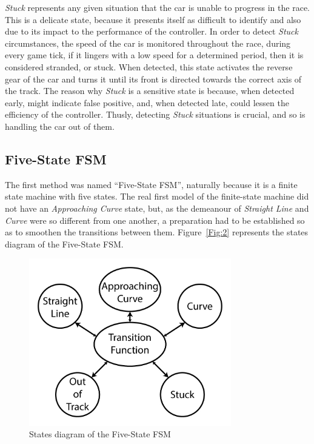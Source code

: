 	\emph{Stuck} represents any given situation that the car is unable to progress in the race. This is a delicate state, because it presents itself as difficult to identify and also due to its impact to the performance of the controller. In order to detect \emph{Stuck} circumstances, the speed of the car is monitored throughout the race, during every game tick, if it lingers with a low speed for a determined period, then it is considered stranded, or stuck. When detected, this state activates the reverse gear of the car and turns it until its front is directed towards the correct axis of the track. The reason why \emph{Stuck} is a sensitive state is because, when detected early, might indicate false positive, and, when detected late, could lessen the efficiency of the controller. Thusly, detecting \textit{Stuck} situations is crucial, and so is handling the car out of them.
	
\subsection{Five-State FSM} \label{subsec:FSM5}

	The first method was named ``Five-State FSM'', naturally because it is a finite state machine with five states. The real first model of the finite-state machine did not have an \emph{Approaching Curve} state, but, as the demeanour of \emph{Straight Line} and \emph{Curve} were so different from one another, a preparation had to be established so as to smoothen the transitions between them. Figure~\ref{Fig:2} represents the states diagram of the Five-State FSM.
	
	\begin{figure}[h]
		
		\centering
		\includegraphics[width=250pt]{FiveStateFSM}
		\caption{States diagram of the Five-State FSM}
		\label{Fig:FSM5Diagram}
		
	\end{figure}
	
